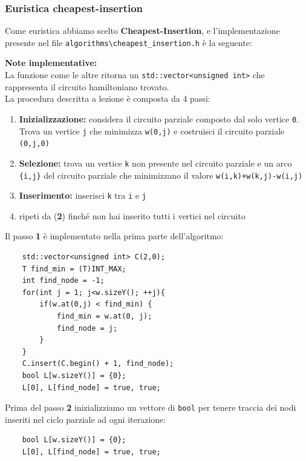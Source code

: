 \documentclass[]{article}
\begin{document}
\subsubsection{Euristica cheapest-insertion}
\begin{flushleft}
Come euristica abbiamo scelto \textbf{Cheapest-Insertion}, e l'implementazione presente nel file \verb|algorithms\cheapest_insertion.h| è la seguente:
\lstset{language=c++, style=mystyle}


\textbf{Note implementative:}\\
La funzione come le altre ritorna un \verb|std::vector<unsigned int>| che rappresenta il circuito hamiltoniano trovato.\\
La procedura descritta a lezione è composta da 4 passi:
\begin{enumerate}
\item \textbf{Inizializzazione:} considera il circuito parziale composto dal solo vertice \verb|0|. Trova un vertice \verb|j| che minimizza \verb|w(0,j)| e costruisci il circuito parziale \verb|(0,j,0)|
\item \textbf{Selezione:} trova un vertice \verb|k| non presente nel circuito parziale e un arco \verb|{i,j}| del circuito parziale che minimizzano il valore \verb|w(i,k)+w(k,j)-w(i,j)|
\item \textbf{Inserimento:} inserisci \verb|k| tra \verb|i| e \verb|j|
\item ripeti da (\textbf{2}) finché non hai inserito tutti i vertici nel circuito
\end{enumerate}
Il passo \textbf{1} è implementato nella prima parte dell'algoritmo:
\lstset{language=c++, style=mystyle, firstnumber=2}
\begin{lstlisting}
    std::vector<unsigned int> C(2,0);
    T find_min = (T)INT_MAX;
    int find_node = -1;
    for(int j = 1; j<w.sizeY(); ++j){
        if(w.at(0,j) < find_min) {
            find_min = w.at(0, j);
            find_node = j;
        }
    }
    C.insert(C.begin() + 1, find_node);
    bool L[w.sizeY()] = {0};
    L[0], L[find_node] = true, true;
\end{lstlisting}
Prima del passo \textbf{2} inizializziamo un vettore di \verb|bool| per tenere traccia dei nodi inseriti nel ciclo parziale ad ogni iterazione:
\lstset{language=c++, style=mystyle, firstnumber=12}
\begin{lstlisting}
    bool L[w.sizeY()] = {0};
    L[0], L[find_node] = true, true;
\end{lstlisting}

\end{flushleft}
\end{document}
